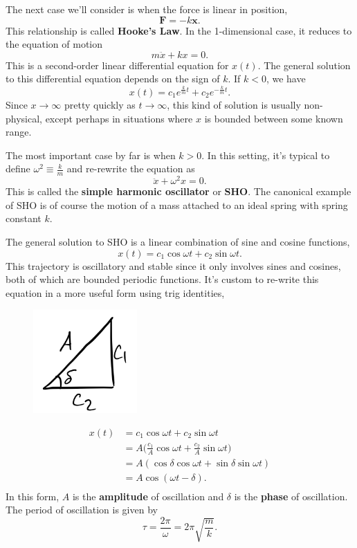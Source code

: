 \documentclass[
  letterpaper,
  DIV=11,
  numbers=noendperiod]{scrreprt}
\begin{document}
The next case we'll consider is when the force is linear in position, \[
\mathbf{F} = -k \mathbf{x}.
\] This relationship is called \textbf{Hooke's Law}. In the
1-dimensional case, it reduces to the equation of motion \[
m \ddot x + kx = 0.
\] This is a second-order linear differential equation for \(x(t)\). The
general solution to this differential equation depends on the sign of
\(k\). If \(k < 0\), we have \[
x(t) = c_1 e^{\frac{k}{m}t} + c_2 e^{-\frac{k}{m}t}.
\] Since \(x \rightarrow \infty\) pretty quickly as
\(t \rightarrow \infty\), this kind of solution is usually non-physical,
except perhaps in situations where \(x\) is bounded between some known
range.

The most important case by far is when \(k > 0\). In this setting, it's
typical to define \(\omega^2 \equiv \frac{k}{m}\) and re-rewrite the
equation as \[
\ddot x + \omega^2 x = 0.
\] This is called the \textbf{simple harmonic oscillator} or
\textbf{SHO}. The canonical example of SHO is of course the motion of a
mass attached to an ideal spring with spring constant \(k\).

The general solution to SHO is a linear combination of sine and cosine
functions, \[
x(t) = c_1 \cos \omega t + c_2 \sin \omega t.
\] This trajectory is oscillatory and stable since it only involves
sines and cosines, both of which are bounded periodic functions. It's
custom to re-write this equation in a more useful form using trig
identities,

\begin{figure}

{\centering \includegraphics[width=1.5625in,height=\textheight]{classical-mechanics/./resources/image-20230214055348215.png}

}

\end{figure}

\[
\begin{align*}
x(t) &= c_1 \cos \omega t + c_2 \sin \omega t \\
&= A\bigg(\frac{c_1}{A}\cos \omega t + \frac{c_2}{A}\sin\omega t \bigg) \\
&= A(\cos\delta \cos \omega t + \sin\delta\sin\omega t) \\
&= A\cos(\omega t - \delta). \\
\end{align*}
\] In this form, \(A\) is the \textbf{amplitude} of oscillation and
\(\delta\) is the \textbf{phase} of oscillation. The period of
oscillation is given by \[
\tau = \frac{2\pi}{\omega} = 2\pi\sqrt{\frac{m}{k}}.
\]
\end{document}
